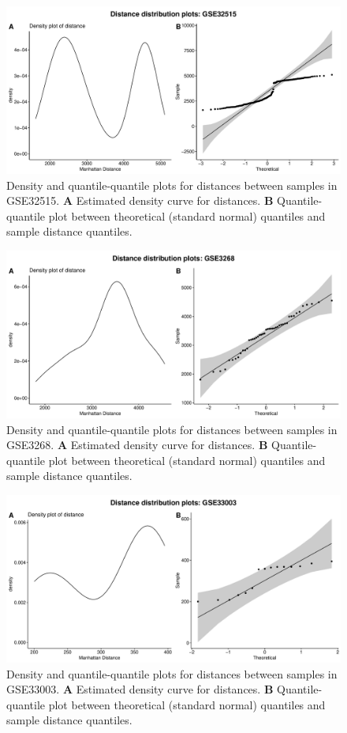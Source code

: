 \documentclass[10pt,letterpaper]{article}\usepackage[]{graphicx}\usepackage[]{color}
\begin{document}
\begin{figure}[H]
	\includegraphics[width=\textwidth]{manhattan-distance_hist_GSE32515.pdf}
	\caption{Density and quantile-quantile plots for distances between samples in GSE32515. \textbf{A} Estimated density curve for distances. \textbf{B} Quantile-quantile plot between theoretical (standard normal) quantiles and sample distance quantiles.}
\end{figure}

\begin{figure}[H]
	\includegraphics[width=\textwidth]{manhattan-distance_hist_GSE3268.pdf}
	\caption{Density and quantile-quantile plots for distances between samples in GSE3268. \textbf{A} Estimated density curve for distances. \textbf{B} Quantile-quantile plot between theoretical (standard normal) quantiles and sample distance quantiles.}
\end{figure}

\begin{figure}[H]
	\includegraphics[width=\textwidth]{manhattan-distance_hist_GSE33003.pdf}
	\caption{Density and quantile-quantile plots for distances between samples in GSE33003. \textbf{A} Estimated density curve for distances. \textbf{B} Quantile-quantile plot between theoretical (standard normal) quantiles and sample distance quantiles.}
\end{figure}
\end{document}
